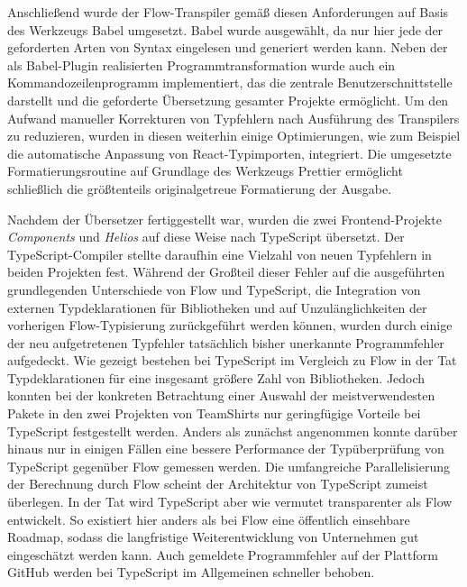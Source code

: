 Anschließend wurde der Flow-Transpiler gemäß diesen Anforderungen auf Basis des Werkzeugs Babel umgesetzt. Babel wurde ausgewählt, da nur hier jede der geforderten Arten von Syntax eingelesen und generiert werden kann. Neben der als Babel-Plugin realisierten Programmtransformation wurde auch ein Kommandozeilenprogramm implementiert, das die zentrale Benutzerschnittstelle darstellt und die geforderte Übersetzung gesamter Projekte ermöglicht. Um den Aufwand manueller Korrekturen von Typfehlern nach Ausführung des Transpilers zu reduzieren, wurden in diesen weiterhin einige Optimierungen, wie zum Beispiel die automatische Anpassung von React-Typimporten, integriert. Die umgesetzte Formatierungsroutine auf Grundlage des Werkzeugs Prettier ermöglicht schließlich die größtenteils originalgetreue Formatierung der Ausgabe.

Nachdem der Übersetzer fertiggestellt war, wurden die zwei Frontend-Projekte \textit{Components} und \textit{Helios} auf diese Weise nach TypeScript übersetzt. Der TypeScript-Compiler stellte daraufhin eine Vielzahl von neuen Typfehlern in beiden Projekten fest. Während der Großteil dieser Fehler auf die ausgeführten  grundlegenden Unterschiede von Flow und TypeScript, die Integration von externen Typdeklarationen für Bibliotheken und auf Unzulänglichkeiten der vorherigen Flow-Typisierung zurückgeführt werden können, wurden durch einige der neu aufgetretenen Typfehler tatsächlich bisher unerkannte Programmfehler aufgedeckt. Wie gezeigt bestehen bei TypeScript im Vergleich zu Flow in der Tat Typdeklarationen für eine insgesamt größere Zahl von Bibliotheken. Jedoch konnten bei der konkreten Betrachtung einer Auswahl der meistverwendesten Pakete in den zwei Projekten von TeamShirts nur geringfügige Vorteile bei TypeScript festgestellt werden. Anders als zunächst angenommen konnte darüber hinaus nur in einigen Fällen eine bessere Performance der Typüberprüfung von TypeScript gegenüber Flow gemessen werden. Die umfangreiche Parallelisierung der Berechnung durch Flow scheint der Architektur von TypeScript zumeist überlegen. In der Tat wird TypeScript aber wie vermutet transparenter als Flow entwickelt. So existiert hier anders als bei Flow eine öffentlich einsehbare Roadmap, sodass die langfristige Weiterentwicklung von Unternehmen gut eingeschätzt werden kann. Auch gemeldete Programmfehler auf der Plattform GitHub werden bei TypeScript im Allgemeinen schneller behoben.

